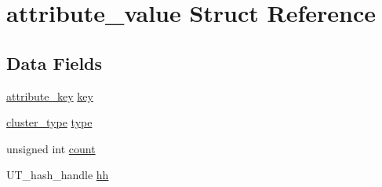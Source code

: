 \hypertarget{structattribute__value}{
\section{attribute\_\-value Struct Reference}
\label{structattribute__value}
}
\subsection*{Data Fields}
\begin{DoxyCompactItemize}
\item 
\hyperlink{structattribute__key}{attribute\_\-key} \hyperlink{structattribute__value_aa8b5ae41c150e4fefb800d3b1924278d}{key}
\item 
\hyperlink{spp__ai_8h_ae2ff3c6586aa2ab211a102abfde86640}{cluster\_\-type} \hyperlink{structattribute__value_a5322c4edde771a7ee0d9fc5f5e45484c}{type}
\item 
unsigned int \hyperlink{structattribute__value_a5579c0304c2e9ab488ac94905b385045}{count}
\item 
UT\_\-hash\_\-handle \hyperlink{structattribute__value_a9abf5d1758ee0cc4803e3b40fc4481cc}{hh}
\end{DoxyCompactItemize}


